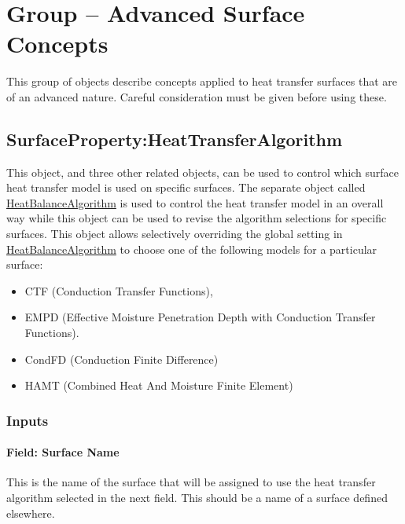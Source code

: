 \section{Group -- Advanced Surface Concepts}\label{group-advanced-surface-concepts}

This group of objects describe concepts applied to heat transfer surfaces that are of an advanced nature. Careful consideration must be given before using these.

\subsection{SurfaceProperty:HeatTransferAlgorithm}\label{surfacepropertyheattransferalgorithm}

This object, and three other related objects, can be used to control which surface heat transfer model is used on specific surfaces. The separate object called \hyperref[heatbalancealgorithm]{HeatBalanceAlgorithm} is used to control the heat transfer model in an overall way while this object can be used to revise the algorithm selections for specific surfaces. This object allows selectively overriding the global setting in \hyperref[heatbalancealgorithm]{HeatBalanceAlgorithm} to choose one of the following models for a particular surface:

\begin{itemize}
\item
  CTF (Conduction Transfer Functions),
\item
  EMPD (Effective Moisture Penetration Depth with Conduction Transfer Functions).
\item
  CondFD (Conduction Finite Difference)
\item
  HAMT (Combined Heat And Moisture Finite Element)
\end{itemize}

\subsubsection{Inputs}\label{inputs-000}

\paragraph{Field: Surface Name}\label{field-surface-name}

This is the name of the surface that will be assigned to use the heat transfer algorithm selected in the next field. This should be a name of a surface defined elsewhere.

